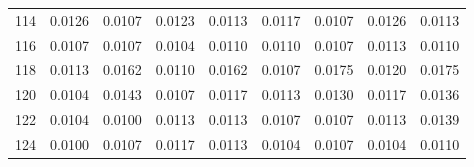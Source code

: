 \documentclass[11pt]{article}
\theoremstyle{definition}
\begin{document}
\begin{table}[ht]
\begin{tabular}{rrrrrrrrr}
  114 & 0.0126 & 0.0107 & 0.0123 & 0.0113 & 0.0117 & 0.0107 & 0.0126 & 0.0113 \\ 
  116 & 0.0107 & 0.0107 & 0.0104 & 0.0110 & 0.0110 & 0.0107 & 0.0113 & 0.0110 \\ 
  118 & 0.0113 & 0.0162 & 0.0110 & 0.0162 & 0.0107 & 0.0175 & 0.0120 & 0.0175 \\ 
  120 & 0.0104 & 0.0143 & 0.0107 & 0.0117 & 0.0113 & 0.0130 & 0.0117 & 0.0136 \\ 
  122 & 0.0104 & 0.0100 & 0.0113 & 0.0113 & 0.0107 & 0.0107 & 0.0113 & 0.0139 \\ 
  124 & 0.0100 & 0.0107 & 0.0117 & 0.0113 & 0.0104 & 0.0107 & 0.0104 & 0.0110 \\
   \hline
\end{tabular}
\end{table}
\end{document}
